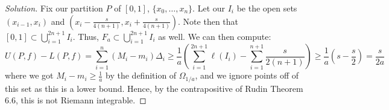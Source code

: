 \documentclass{article}
\begin{document}
\begin{enumerate}
\begin{proof}[Solution]
		Fix our partition $P$ of $[0,1]$, $\{x_0,\dots,x_n\}$.
		Let our $I_i$ be the open sets $(x_{i-1},x_i)$
		and $(x_i-\frac{s}{4(n+1)}, x_i + \frac{s}{4(n+1)})$.
		Note then that $[0,1] \subset \bigcup_{i=1}^{2n+1}I_i$.
		Thus, $F_a \subset \bigcup_{i=1}^{2n+1}I_i$ as well.
		We can then compute:
		\[
			U(P,f) - L(P,f)
			= \sum_{i=1}^{n}(M_i - m_i)\Delta_i
			\geq \frac{1}{a}\left(\sum_{i=1}^{2n+1}\ell(I_i) - \sum_{i=1}^{n+1}\frac{s}{2(n+1)}\right)
			\geq \frac{1}{a}(s - \frac{s}{2})
			= \frac{s}{2a}
		\]
		where we got $M_i - m_i \geq \frac{1}{a}$
		by the definition of $\Omega_{1/a}$,
		and we ignore points off of this set as this is a lower bound.
		Hence, by the contrapositive of Rudin Theorem 6.6,
		this is not Riemann integrable.
	\end{proof}
\end{enumerate}
\end{document}
